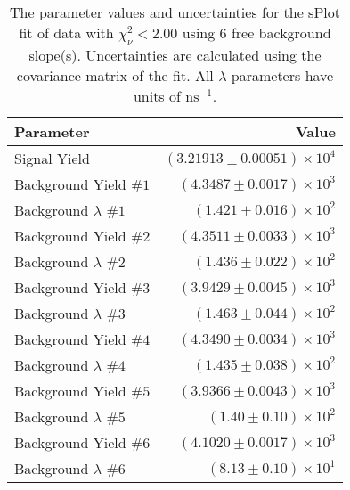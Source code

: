 
\begin{table}
    \begin{center}
        \begin{tabular}{lr}\toprule
            Parameter & Value \\\midrule
            Signal Yield & $(3.21913 \pm 0.00051) \times 10^{4}$ \\
            Background Yield $\#1$ & $(4.3487 \pm 0.0017) \times 10^{3}$ \\
            Background $\lambda$ $\#1$ & $(1.421 \pm 0.016) \times 10^{2}$ \\
            Background Yield $\#2$ & $(4.3511 \pm 0.0033) \times 10^{3}$ \\
            Background $\lambda$ $\#2$ & $(1.436 \pm 0.022) \times 10^{2}$ \\
            Background Yield $\#3$ & $(3.9429 \pm 0.0045) \times 10^{3}$ \\
            Background $\lambda$ $\#3$ & $(1.463 \pm 0.044) \times 10^{2}$ \\
            Background Yield $\#4$ & $(4.3490 \pm 0.0034) \times 10^{3}$ \\
            Background $\lambda$ $\#4$ & $(1.435 \pm 0.038) \times 10^{2}$ \\
            Background Yield $\#5$ & $(3.9366 \pm 0.0043) \times 10^{3}$ \\
            Background $\lambda$ $\#5$ & $(1.40 \pm 0.10) \times 10^{2}$ \\
            Background Yield $\#6$ & $(4.1020 \pm 0.0017) \times 10^{3}$ \\
            Background $\lambda$ $\#6$ & $(8.13 \pm 0.10) \times 10^{1}$ \\\bottomrule
        \end{tabular}
        \caption{The parameter values and uncertainties for the sPlot fit of data with $\chi^2_\nu < 2.00$ using 6 free background slope(s). Uncertainties are calculated using the covariance matrix of the fit. All $\lambda$ parameters have units of $\si{\nano\second}^{-1}$.}
    \end{center}
\end{table}
